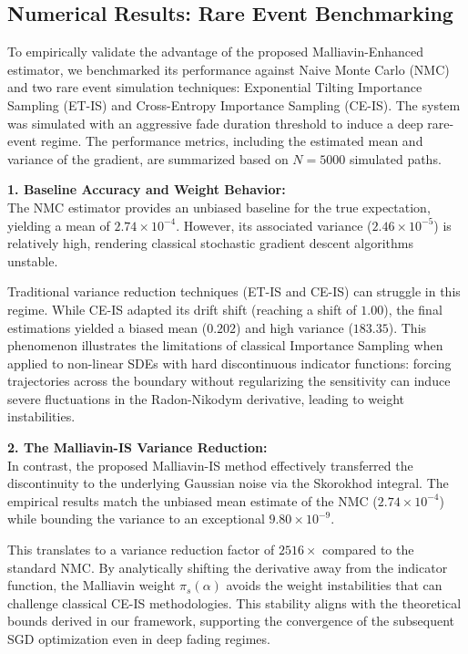 \documentclass[11pt]{article}
\begin{document}
\subsection{Numerical Results: Rare Event Benchmarking}

To empirically validate the advantage of the proposed Malliavin-Enhanced estimator, we benchmarked its performance against Naive Monte Carlo (NMC) and two rare event simulation techniques: Exponential Tilting Importance Sampling (ET-IS) and Cross-Entropy Importance Sampling (CE-IS). The system was simulated with an aggressive fade duration threshold to induce a deep rare-event regime. The performance metrics, including the estimated mean and variance of the gradient, are summarized based on $N = 5000$ simulated paths.

\textbf{1. Baseline Accuracy and Weight Behavior:}\\
The NMC estimator provides an unbiased baseline for the true expectation, yielding a mean of $2.74 \times 10^{-4}$. However, its associated variance ($2.46 \times 10^{-5}$) is relatively high, rendering classical stochastic gradient descent algorithms unstable. 

Traditional variance reduction techniques (ET-IS and CE-IS) can struggle in this regime. While CE-IS adapted its drift shift (reaching a shift of $1.00$), the final estimations yielded a biased mean ($0.202$) and high variance ($183.35$). This phenomenon illustrates the limitations of classical Importance Sampling when applied to non-linear SDEs with hard discontinuous indicator functions: forcing trajectories across the boundary without regularizing the sensitivity can induce severe fluctuations in the Radon-Nikodym derivative, leading to weight instabilities.

\textbf{2. The Malliavin-IS Variance Reduction:}\\
In contrast, the proposed Malliavin-IS method effectively transferred the discontinuity to the underlying Gaussian noise via the Skorokhod integral. The empirical results match the unbiased mean estimate of the NMC ($2.74 \times 10^{-4}$) while bounding the variance to an exceptional $9.80 \times 10^{-9}$. 

This translates to a variance reduction factor of $2516\times$ compared to the standard NMC. By analytically shifting the derivative away from the indicator function, the Malliavin weight $\pi_s(\alpha)$ avoids the weight instabilities that can challenge classical CE-IS methodologies. This stability aligns with the theoretical bounds derived in our framework, supporting the convergence of the subsequent SGD optimization even in deep fading regimes.
\end{document}
